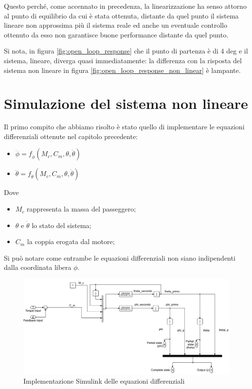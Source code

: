 Questo perché, come accennato in precedenza, la linearizzazione ha senso attorno al punto di equilibrio da cui è stata ottenuta, distante da quel punto il sistema lineare non approssima più il sistema reale ed anche un eventuale controllo ottenuto da esso non garantisce buone performance distante da quel punto. 

Si nota, in figura \ref{fig:open_loop_response} che il punto di partenza è di 4 deg e il sistema, lineare, diverga quasi immediatamente: la differenza con la risposta del sistema non lineare in figura \ref{fig:open_loop_response_non_linear} è lampante.


\section{Simulazione del sistema non lineare}
Il primo compito che abbiamo risolto è stato quello di implementare le equazioni differenziali ottenute nel capitolo precedente:
\begin{itemize}
	\item $\ddot{\phi} = f_{\ddot{\phi}} (M_c, C_m, \theta,\dot{\theta})$
	\item $\ddot{\theta} = f_{\ddot{\theta}} (M_c, C_m, \theta,\dot{\theta})$
\end{itemize}
Dove 
\begin{itemize}
	\item $M_c$ rappresenta la massa del passeggero;
	\item $\theta$ e $\dot{\theta}$ lo stato del sistema;
	\item $C_m$  la coppia erogata dal motore;
\end{itemize}

Si può notare come entrambe le equazioni differenziali non siano indipendenti dalla coordinata libera $\phi$.
\begin{figure}[H]
	\centering   	
	\includegraphics[width=1\textwidth]{Immagini/non_linear_system.png}
	\caption{Implementazione Simulink delle equazioni differenziali}
	\label{fig:non_linear_system}
\end{figure}

